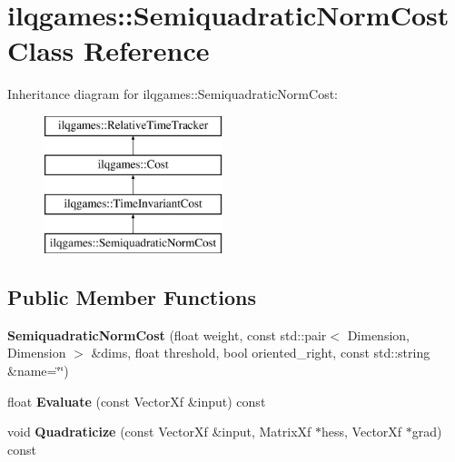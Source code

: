 \hypertarget{classilqgames_1_1_semiquadratic_norm_cost}{}\section{ilqgames\+:\+:Semiquadratic\+Norm\+Cost Class Reference}
\label{classilqgames_1_1_semiquadratic_norm_cost}
Inheritance diagram for ilqgames\+:\+:Semiquadratic\+Norm\+Cost\+:\begin{figure}[H]
\begin{center}
\leavevmode
\includegraphics[height=4.000000cm]{classilqgames_1_1_semiquadratic_norm_cost}
\end{center}
\end{figure}
\subsection*{Public Member Functions}
\begin{DoxyCompactItemize}
\item 
{\bfseries Semiquadratic\+Norm\+Cost} (float weight, const std\+::pair$<$ Dimension, Dimension $>$ \&dims, float threshold, bool oriented\+\_\+right, const std\+::string \&name=\char`\"{}\char`\"{})\hypertarget{classilqgames_1_1_semiquadratic_norm_cost_a1f2f9189770f6128afe12d3a3aed0a7a}{}\label{classilqgames_1_1_semiquadratic_norm_cost_a1f2f9189770f6128afe12d3a3aed0a7a}

\item 
float {\bfseries Evaluate} (const Vector\+Xf \&input) const \hypertarget{classilqgames_1_1_semiquadratic_norm_cost_af8df2f58dc246d0d450f53f4fd9086f2}{}\label{classilqgames_1_1_semiquadratic_norm_cost_af8df2f58dc246d0d450f53f4fd9086f2}

\item 
void {\bfseries Quadraticize} (const Vector\+Xf \&input, Matrix\+Xf $\ast$hess, Vector\+Xf $\ast$grad) const \hypertarget{classilqgames_1_1_semiquadratic_norm_cost_a1bdcfcb993589ae6fe8b4f2d3e48b29e}{}\label{classilqgames_1_1_semiquadratic_norm_cost_a1bdcfcb993589ae6fe8b4f2d3e48b29e}

\end{DoxyCompactItemize}
